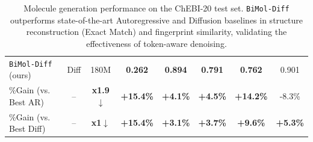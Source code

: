 \begin{table}[t!]
{\begin{tabular}{l c c c c c c c}
        \rowcolor{white!70!yellow}
        \texttt{BiMol-Diff} (ours) & Diff & 180M & \textbf{0.262} & \textbf{0.894} & \textbf{0.791} & \textbf{0.762} & 0.901 \\
        
        \rowcolor{white!70!gray}
        \%Gain (vs. Best AR) & -- & \textbf{x1.9$\downarrow$} & \textbf{+15.4\%} & \textbf{+4.1\%} & \textbf{+4.5\%} & \textbf{+14.2\%} & -8.3\% \\
        
       
        \rowcolor{white!70!gray}
        \%Gain (vs. Best Diff) & -- & \textbf{x1$\downarrow$} & \textbf{+15.4\%} & \textbf{+3.1\%} & \textbf{+3.7\%} & \textbf{+9.6\%} & \textbf{+5.3\%} \\
        \bottomrule
    \end{tabular}%
    }
    \caption{Molecule generation performance on the ChEBI-20 test set. \texttt{BiMol-Diff} outperforms state-of-the-art Autoregressive and Diffusion baselines in structure reconstruction (Exact Match) and fingerprint similarity, validating the effectiveness of token-aware denoising.}
    \label{molecule generation}
    \vspace{-4mm}
\end{table}

